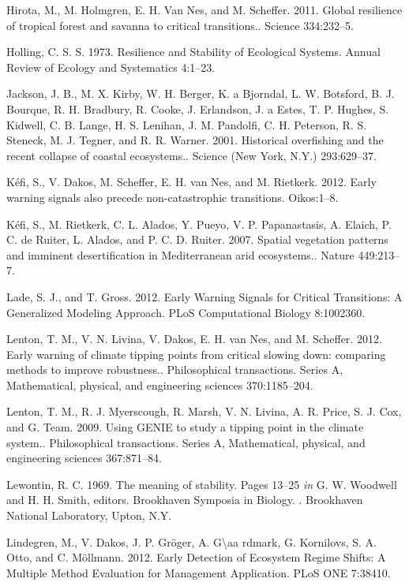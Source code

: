\documentclass{article}
\begin{document}
Hirota, M., M. Holmgren, E. H. Van Nes, and M. Scheffer. 2011. Global
resilience of tropical forest and savanna to critical transitions..
Science 334:232--5.

Holling, C. S. S. 1973. Resilience and Stability of Ecological Systems.
Annual Review of Ecology and Systematics 4:1--23.

Jackson, J. B., M. X. Kirby, W. H. Berger, K. a Bjorndal, L. W.
Botsford, B. J. Bourque, R. H. Bradbury, R. Cooke, J. Erlandson, J. a
Estes, T. P. Hughes, S. Kidwell, C. B. Lange, H. S. Lenihan, J. M.
Pandolfi, C. H. Peterson, R. S. Steneck, M. J. Tegner, and R. R. Warner.
2001. Historical overfishing and the recent collapse of coastal
ecosystems.. Science (New York, N.Y.) 293:629--37.

Kéfi, S., V. Dakos, M. Scheffer, E. H. van Nes, and M. Rietkerk. 2012.
Early warning signals also precede non-catastrophic transitions.
Oikos:1--8.

Kéfi, S., M. Rietkerk, C. L. Alados, Y. Pueyo, V. P. Papanastasis, A.
Elaich, P. C. de Ruiter, L. Alados, and P. C. D. Ruiter. 2007. Spatial
vegetation patterns and imminent desertification in Mediterranean arid
ecosystems.. Nature 449:213--7.

Lade, S. J., and T. Gross. 2012. Early Warning Signals for Critical
Transitions: A Generalized Modeling Approach. PLoS Computational Biology
8:1002360.

Lenton, T. M., V. N. Livina, V. Dakos, E. H. van Nes, and M. Scheffer.
2012. Early warning of climate tipping points from critical slowing
down: comparing methods to improve robustness.. Philosophical
transactions. Series A, Mathematical, physical, and engineering sciences
370:1185--204.

Lenton, T. M., R. J. Myerscough, R. Marsh, V. N. Livina, A. R. Price, S.
J. Cox, and G. Team. 2009. Using GENIE to study a tipping point in the
climate system.. Philosophical transactions. Series A, Mathematical,
physical, and engineering sciences 367:871--84.

Lewontin, R. C. 1969. The meaning of stability. Pages 13--25 \emph{in}
G. W. Woodwell and H. H. Smith, editors. Brookhaven Symposia in Biology.
. Brookhaven National Laboratory, Upton, N.Y.

Lindegren, M., V. Dakos, J. P. Gröger, A. G\textbackslash{}aa rdmark, G.
Kornilovs, S. A. Otto, and C. Möllmann. 2012. Early Detection of
Ecosystem Regime Shifts: A Multiple Method Evaluation for Management
Application. PLoS ONE 7:38410.
\end{document}
